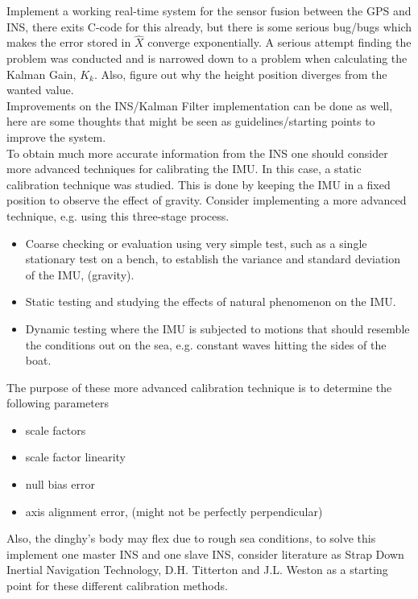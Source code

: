 Implement a working real-time system for the sensor fusion between the GPS and INS, there exits C-code for this already, but there is some serious bug/bugs which makes the error stored in $\hat{X}$ converge exponentially. A serious attempt finding the problem was conducted and is narrowed down to a problem when calculating the Kalman Gain, $K_k$. Also, figure out why the height position diverges from the wanted value.\\

Improvements on the INS/Kalman Filter implementation can be done as well, here are some thoughts that might be seen as guidelines/starting points to improve the system. \\
To obtain much more accurate information from the INS one should consider more advanced techniques for calibrating the IMU. In this case, a static calibration technique was studied. This is done by keeping the IMU in a fixed position to observe the effect of gravity.
Consider implementing a more advanced technique, e.g. using this three-stage process.
\begin{itemize}
\item Coarse checking or evaluation using very simple test, such as a single stationary test on a bench, to establish the variance and standard deviation of the IMU, (gravity).
\item Static testing and studying the effects of natural phenomenon on the IMU.
\item Dynamic testing where the IMU is subjected to motions that should resemble the conditions out on the sea, e.g. constant waves hitting the sides of the boat. 
\end{itemize}
The purpose of these more advanced calibration technique is to determine the following parameters \cite{non-linear}
\begin{itemize}
\item scale factors
\item scale factor linearity
\item null bias error
\item axis alignment error, (might not be perfectly perpendicular)
\end{itemize}
Also, the dinghy's body may flex due to rough sea conditions, to solve this implement one master INS and one slave INS, consider literature as Strap Down Inertial Navigation Technology, D.H. Titterton and J.L. Weston as a starting point for these different calibration methods. \newline 

